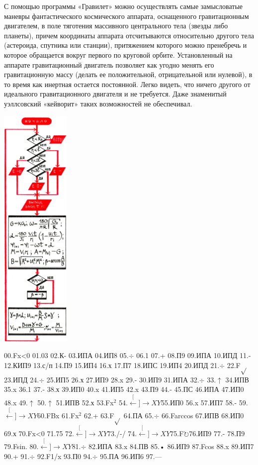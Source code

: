 \documentclass[11pt,a4paper,oneside]{article}
\def\XY{$\stackrel[\leftarrow]{\rightarrow}{XY}$}
\def\FO{F$\circlearrowright$}
\begin{document}
С помощью программы «Гравилет» можно осуществлять самые замысловатые маневры фантастического космического аппарата, оснащенного гравитационным двигателем, в поле тяготения массивного центрального тела (звезды либо планеты), причем координаты аппарата отсчитываются относительно другого тела (астероида, спутника или станции), притяжением которого можно пренебречь и которое обращается вокруг первого по круговой орбите. Установленный на аппарате гравитационный двигатель позволяет как угодно менять его гравитационную массу (делать ее положительной, отрицательной или нулевой), в то время как инертная остается постоянной. Легко видеть, что ничего другого от идеального гравитационного двигателя и не требуется. Даже знаменитый уэллсовский «кейворит» таких возможностей не обеспечивал.

\includegraphics[width=0.25\textwidth]{pulsar_algo}

00.Fx<0 01.03 02.К- 03.ИПА 04.ИП8 05.$\div$ 06.1 07.+
08.П9 09.ИПА 10.ИПД 11.- 12.КИП9 13.с/п 14.П9 15.ИП4 16.х 17.П7 18.ИПС 19.ИП4 20.ИПД 21.$\div$ 22.F$\sqrt{}$ 23.ИПД
24.$\div$ 25.ИП5 26.х 27.ИП9 28.x 29.- 30.ИП9 31.ИПА
32.$\div$ 33.$\uparrow$ 34.ИПВ 35.x 36.1 37.- 38.х 39.ИП0 40.x 41.ИП5 42.x 43.П9 44.- 45.ПС 46.ИПА 47.ИП0 48.x 49.$\uparrow$ 50.$\uparrow$
51.ИПВ 52.х 53.Fx$^{2}$ 54.\XY 55.ИП0 56.x 57.ИП7 58.- 59.\XY 60.FBx 61.Fx$^{2}$ 62.+ 63.F$\sqrt{}$ 64.ПА 65.$\div$ 66.Farccos 67.ИПВ 68.ИП0 69.х 70.Fx<0 71.75 72.\XY 73./-/ 74.\XY 75.\FO 76.ИП9 77.- 78.П9 79.Fsin. 80.\XY 81.$\div$ 82.ИПА 83.x 84.ПВ 85.• 86.ИП9 87.Fcos 88.x 89.ИП7 90.+ 91.$\div$ 92.F1/x 93.П0 94.$\div$ 95.ПА 96.ИП6 97.—
\end{document}
